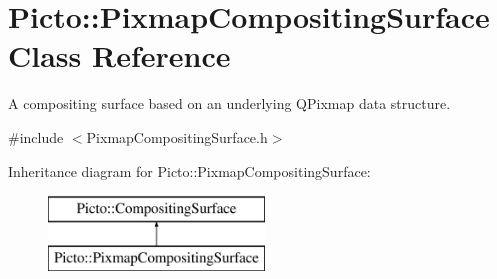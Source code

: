 \hypertarget{class_picto_1_1_pixmap_compositing_surface}{\section{Picto\-:\-:Pixmap\-Compositing\-Surface Class Reference}
\label{class_picto_1_1_pixmap_compositing_surface}
}


A compositing surface based on an underlying Q\-Pixmap data structure.  




{\ttfamily \#include $<$Pixmap\-Compositing\-Surface.\-h$>$}

Inheritance diagram for Picto\-:\-:Pixmap\-Compositing\-Surface\-:\begin{figure}[H]
\begin{center}
\leavevmode
\includegraphics[height=2.000000cm]{class_picto_1_1_pixmap_compositing_surface}
\end{center}
\end{figure}
